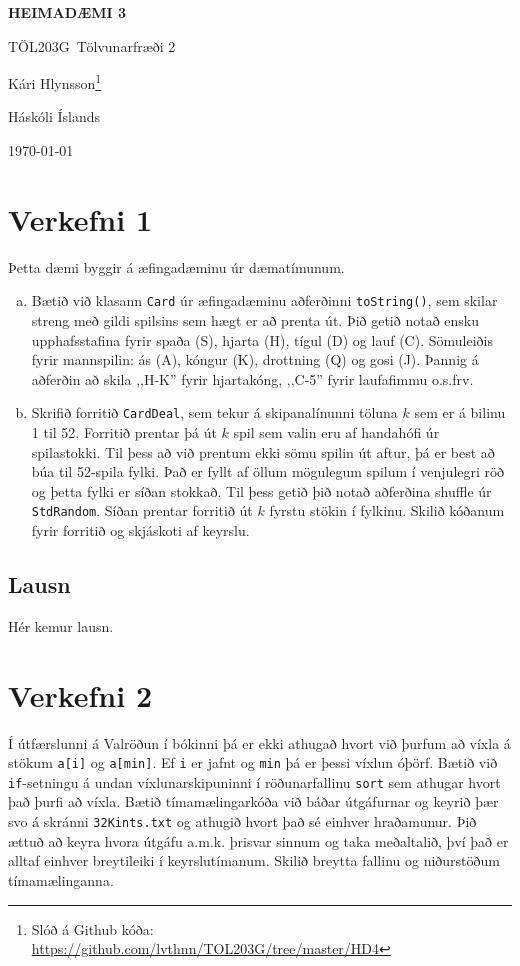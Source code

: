 \documentclass[12pt, a4paper, hidelinks]{article}
\title{}
\newcommand{\doctitle}{\uppercase{Heimadæmi 3}}
\newcommand{\coursename}{Tölvunarfræði 2}
\newcommand{\coursenum}{TÖL203G}
\begin{document}
\thispagestyle{plain}
\centerline{\bfseries\Large\doctitle}
\medskip
\centerline{\large\coursenum\ \coursename}
\bigskip

\centerline{\large Kári Hlynsson\footnote{Slóð á Github kóða: \url{https://github.com/lvthnn/TOL203G/tree/master/HD4}}}
\bigskip
\centerline{Háskóli Íslands}
\medskip
\centerline{\today}

\bigskip

\section*{Verkefni 1}
Þetta dæmi byggir á æfingadæminu úr dæmatímunum.

\begin{enumerate}[(a)]
    \item Bætið við klasann \texttt{Card} úr æfingadæminu aðferðinni \texttt{toString()}, sem skilar
    streng með gildi spilsins sem hægt er að prenta út. Þið getið notað ensku upphafsstafina fyrir spaða
    (S), hjarta (H), tígul (D) og lauf (C). Sömuleiðis fyrir mannspilin: ás (A), kóngur (K), drottning (Q)
    og gosi (J). Þannig á aðferðin að skila ,,H-K'' fyrir hjartakóng, ,,C-5'' fyrir laufafimmu o.s.frv.

    \item Skrifið forritið \texttt{CardDeal}, sem tekur á skipanalínunni töluna $k$ sem er á bilinu 1 til 52.
    Forritið prentar þá út $k$ spil sem valin eru af handahófi úr spilastokki. Til þess að við prentum ekki sömu
    spilin út aftur, þá er best að búa til 52-spila fylki. Það er fyllt af öllum mögulegum spilum í venjulegri röð
    og þetta fylki er síðan stokkað. Til þess getið þið notað aðferðina shuffle úr \texttt{StdRandom}. Síðan prentar
    forritið út $k$ fyrstu stökin í fylkinu. Skilið kóðanum fyrir forritið og skjáskoti af keyrslu.
\end{enumerate}

\subsection*{Lausn}
Hér kemur lausn.

\newpage

\section*{Verkefni 2}
Í útfærslunni á Valröðun í bókinni þá er ekki athugað hvort við þurfum að víxla á stökum \texttt{a[i]} og \texttt{a[min]}.
Ef \texttt{i} er jafnt og \texttt{min} þá er þessi víxlun óþörf. Bætið við \texttt{if}-setningu á undan víxlunarskipuninni
í röðunarfallinu \texttt{sort} sem athugar hvort það þurfi að víxla. Bætið tímamælingarkóða við báðar útgáfurnar og keyrið þær
svo á skránni \texttt{32Kints.txt} og athugið hvort það sé einhver hraðamunur. Þið ættuð að keyra hvora útgáfu a.m.k. þrisvar
sinnum og taka meðaltalið, því það er alltaf einhver breytileiki í keyrslutímanum. Skilið breytta fallinu og niðurstöðum
tímamælinganna.
\end{document}
